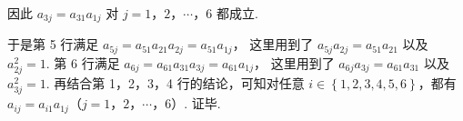\documentclass[UTF8,a4paper,oneside,11pt]{ctexbook}
\begin{document}
\begin{solution}
\begin{enumerate}
因此 \( a_{3j}=a_{31}a_{1j} \) 对 \(j=1\)，\(2\)，\(\cdots\)，\(6\) 都成立.

于是第 5 行满足 \( a_{5j}=a_{51}a_{21}a_{2j}=a_{51}a_{1j} \)，
这里用到了 \( a_{5j}a_{2j}=a_{51}a_{21} \) 以及 \( a_{2j}^2=1 \).
第 6 行满足 \( a_{6j}=a_{61}a_{31}a_{3j}=a_{61}a_{1j} \)，
这里用到了 \( a_{6j}a_{3j}=a_{61}a_{31} \) 以及 \( a_{3j}^2=1 \).
再结合第 1，2，3，4 行的结论，可知对任意 \( i\in \left\{ 1,2,3,4,5,6 \right\} \)，都有 \( a_{ij}=a_{i1}a_{1j} \)（\(j=1\)，\(2\)，\(\cdots\)，\(6\)）.
证毕.
\end{enumerate}
\end{solution}

\end{document}
